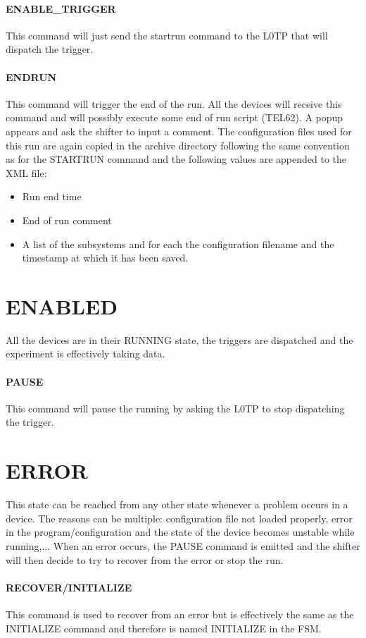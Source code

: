 \documentclass[a4paper]{article}
\begin{document}
\paragraph{ENABLE\_TRIGGER} This command will just send the startrun command to the L0TP that will dispatch the trigger.

\paragraph{ENDRUN} This command will trigger the end of the run. All the devices will receive this command and will possibly execute some end of run script (TEL62). A popup appears and ask the shifter to input a comment. The configuration files used for this run are again copied in the archive directory following the same convention as for the STARTRUN command and the following values are appended to the XML file:
\begin{itemize}
	\item Run end time
	\item End of run comment
	\item A list of the subsystems and for each the configuration filename and the timestamp at which it has been saved.
\end{itemize}

\section{ENABLED} All the devices are in their RUNNING state, the triggers are dispatched and the experiment is effectively taking data.

\paragraph{PAUSE} This command will pause the running by asking the L0TP to stop dispatching the trigger.

\section{ERROR} This state can be reached from any other state whenever a problem occurs in a device. The reasons can be multiple: configuration file not loaded properly, error in the program/configuration and the state of the device becomes unstable while running,...
When an error occurs, the PAUSE command is emitted and the shifter will then decide to try to recover from the error or stop the run.

\paragraph{RECOVER/INITIALIZE} This command is used to recover from an error but is effectively the same as the INITIALIZE command and therefore is named INITIALIZE in the FSM.
\end{document}
